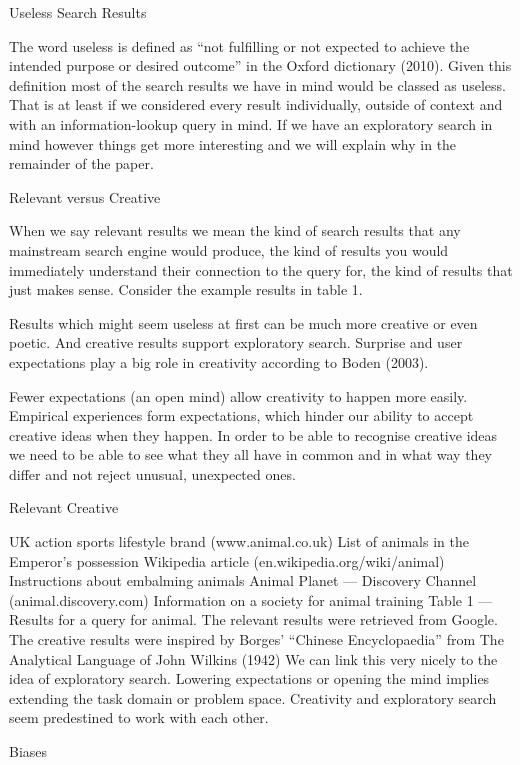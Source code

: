 
Useless Search Results

The word useless is defined as ``not fulfilling or not expected to achieve the intended purpose or desired outcome'' in the Oxford dictionary (2010). Given this definition most of the search results we have in mind would be classed as useless. That is at least if we considered every result individually, outside of context and with an information-lookup query in mind. If we have an exploratory search in mind however things get more interesting and we will explain why in the remainder of the paper.

Relevant versus Creative

When we say relevant results we mean the kind of search results that any mainstream search engine would produce, the kind of results you would immediately understand their connection to the query for, the kind of results that just makes sense. Consider the example results in table 1.

Results which might seem useless at first can be much more creative or even poetic. And creative results support exploratory search. Surprise and user expectations play a big role in creativity according to Boden (2003).

Fewer expectations (an open mind) allow creativity to happen more easily. Empirical experiences form expectations, which hinder our ability to accept creative ideas when they happen. In order to be able to recognise creative ideas we need to be able to see what they all have in common and in what way they differ and not reject unusual, unexpected ones.

Relevant	Creative

UK action sports lifestyle brand
(www.animal.co.uk)	List of animals in the Emperor’s possession
Wikipedia article
(en.wikipedia.org/wiki/animal)	Instructions about embalming animals
Animal Planet --- Discovery Channel (animal.dis\-covery.com) 	Information on a society for animal training
Table 1 --- Results for a query for animal. The relevant results were retrieved from Google. The creative results were inspired by Borges’ “Chinese Encyclopaedia” from The Analytical Language of John Wilkins (1942)
We can link this very nicely to the idea of exploratory search. Lowering expectations or opening the mind implies extending the task domain or problem space. Creativity and exploratory search seem predestined to work with each other.

Biases


